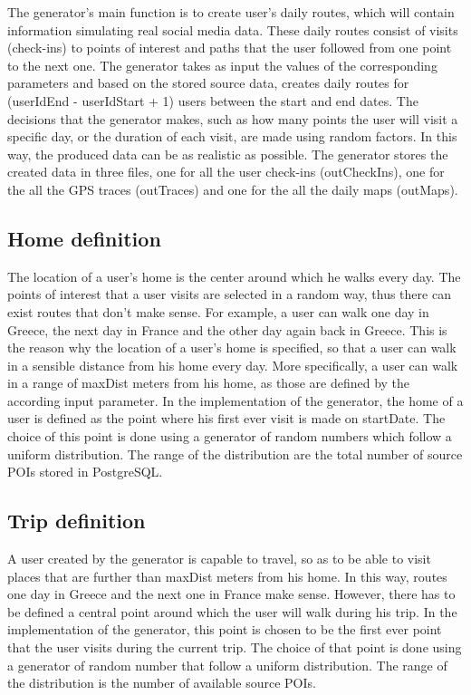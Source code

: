 The generator's main function is to create user's daily routes, which will contain information simulating real social media data. These daily routes 
consist of visits (check-ins) to points of interest and paths that the user followed from one point to the next one. The generator takes as input the 
values of the corresponding parameters and based on the stored source data, creates daily routes for (userIdEnd - userIdStart + 1) users between 
the start and end dates. The decisions that the generator makes, such as how many points the user will visit a specific day, or the duration 
of each visit, are made using random factors. In this way, the produced data can be as realistic as possible. The generator stores the created data in three files, 
one for all the user check-ins (outCheckIns), one for the all the GPS traces (outTraces) and one for the all the daily maps (outMaps).

\subsection{Home definition}

The location of a user's home is the center around which he walks every day. The points of interest that a user visits are selected in a random way, thus there can 
exist routes that don't make sense. For example, a user can walk one day in Greece, the next day in France and the other day again back in Greece. This is the reason 
why the location of a user's home is specified, so that a user can walk in a sensible distance from his home every day. More specifically, a user can walk in a range 
of maxDist meters from his home, as those are defined by the according input parameter. In the implementation of the generator, the home of a user is defined as 
the point where his first ever visit is made on startDate. The choice of this point is done using a generator of random numbers which follow a uniform distribution. 
The range of the distribution are the total number of source POIs stored in PostgreSQL.

\subsection{Trip definition}

A user created by the generator is capable to travel, so as to be able to visit places that are further than maxDist meters from his home. In this way, 
routes one day in Greece and the next one in France make sense. However, there has to be defined a central point around which the user will walk during his trip. 
In the implementation of the generator, this point is chosen to be the first ever point that the user visits during the current trip. 
The choice of that point is done using a generator of random number that follow a uniform distribution. The range of the distribution is the number 
of available source POIs.

